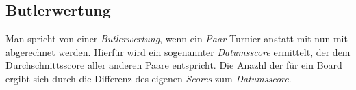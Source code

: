 \subsection{Butlerwertung}\label{butlerwertung}

\noindent
Man spricht von einer \textit{Butlerwertung}, wenn ein \textit{Paar-}Turnier anstatt
mit \mps nun mit \imps abgerechnet werden. Hierfür wird ein sogenannter \textit{Datumsscore}
ermittelt, der dem Durchschnittsscore aller anderen Paare entspricht. Die Anazhl der \imps für ein Board ergibt sich durch die Differenz des eigenen \textit{Scores} zum \textit{Datumsscore}.
